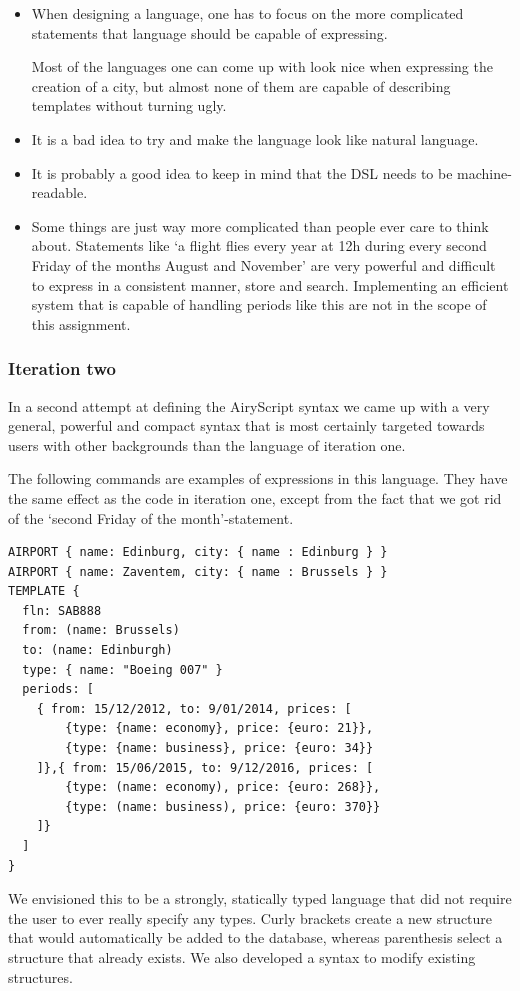 \begin{itemize}
  \item When designing a language, one has to focus on the more complicated
    statements that language should be capable of expressing.

    Most of the languages one can come up with look nice when expressing the
    creation of a city, but almost none of them are capable of describing
    templates without turning ugly.
  \item It is a bad idea to
  try and make the language look like natural language.
  \item It is probably a good idea to keep in mind that the DSL needs to be
    machine-readable.
  \item Some things are just way more complicated than people ever care to think
    about. Statements like ‘a flight flies every year at 12h during every second
    Friday of the months August and November’ are very powerful and difficult to
    express in a consistent manner, store and search. Implementing an efficient
    system that is capable of handling periods like this are not in the scope of
    this assignment.
\end{itemize}


\subsubsection{Iteration two}
In a second attempt at defining the AiryScript syntax we came up with a very
general, powerful and compact syntax that is most certainly targeted towards
users with other backgrounds than the language of iteration one.

The following commands are examples of expressions in this language. They have
the same effect as the code in iteration one, except from the fact that we got
rid of the ‘second Friday of the month’-statement.
\begin{lstlisting}[language=empty,frame=single]
AIRPORT { name: Edinburg, city: { name : Edinburg } }
AIRPORT { name: Zaventem, city: { name : Brussels } }
TEMPLATE {
  fln: SAB888
  from: (name: Brussels)
  to: (name: Edinburgh)
  type: { name: "Boeing 007" }
  periods: [
    { from: 15/12/2012, to: 9/01/2014, prices: [
        {type: {name: economy}, price: {euro: 21}},
        {type: {name: business}, price: {euro: 34}}
    ]},{ from: 15/06/2015, to: 9/12/2016, prices: [
        {type: (name: economy), price: {euro: 268}},
        {type: (name: business), price: {euro: 370}}
    ]}
  ]
}
\end{lstlisting}
We envisioned this to be a strongly, statically typed language that did not
require the user to ever really specify any types. Curly brackets create a new
structure that would automatically be added to the database, whereas parenthesis
select a structure that already exists. We also developed a syntax to modify
existing structures.

